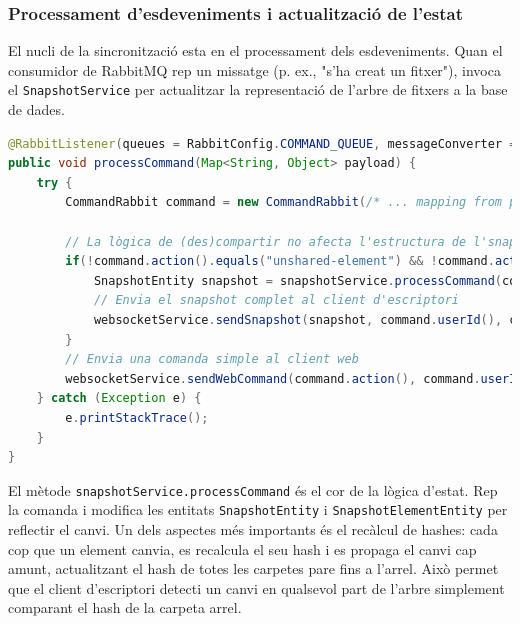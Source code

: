 \subsubsection{Processament d'esdeveniments i actualització de l'estat}

El nucli de la sincronització esta en el processament dels esdeveniments. Quan el consumidor de RabbitMQ rep un missatge (p. ex., "s'ha creat un fitxer"), invoca el \texttt{SnapshotService} per actualitzar la representació de l'arbre de fitxers a la base de dades.

\begin{lstlisting}[language=Java, caption={Listener de RabbitMQ per processar comandes a `Receiver`}]
@RabbitListener(queues = RabbitConfig.COMMAND_QUEUE, messageConverter = "jackson2JsonMessageConverter")
public void processCommand(Map<String, Object> payload) {
    try {
        CommandRabbit command = new CommandRabbit(/* ... mapping from payload ... */);
        
        // La lògica de (des)compartir no afecta l'estructura de l'snapshot directament
        if(!command.action().equals("unshared-element") && !command.action().equals("shared-element")) {
            SnapshotEntity snapshot = snapshotService.processCommand(command);
            // Envia el snapshot complet al client d'escriptori
            websocketService.sendSnapshot(snapshot, command.userId(), command.connectionId());
        }
        // Envia una comanda simple al client web
        websocketService.sendWebCommand(command.action(), command.userId(), command.connectionId(), command.elementId(), command.parentId());
    } catch (Exception e) {
        e.printStackTrace();
    }
}
\end{lstlisting}

El mètode \texttt{snapshotService.processCommand} és el cor de la lògica d'estat. Rep la comanda i modifica les entitats \texttt{SnapshotEntity} i \texttt{SnapshotElementEntity} per reflectir el canvi. Un dels aspectes més importants és el recàlcul de hashes: cada cop que un element canvia, es recalcula el seu hash i es propaga el canvi cap amunt, actualitzant el hash de totes les carpetes pare fins a l'arrel. Això permet que el client d'escriptori detecti un canvi en qualsevol part de l'arbre simplement comparant el hash de la carpeta arrel.

